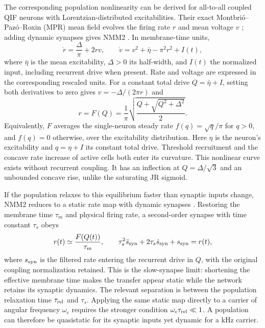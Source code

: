 \documentclass[11pt,a4paper]{article}
\providecommand{\DIFaddtex}[1]{{\protect\color{blue} \sf #1}} %
\providecommand{\DIFaddbegin}{} %
\providecommand{\DIFaddend}{} %
\providecommand{\DIFadd}[1]{\texorpdfstring{\DIFaddtex{#1}}{#1}} %
\begin{document}
The corresponding population nonlinearity can be derived for all-to-all coupled
QIF neurons with Lorentzian-distributed excitabilities. Their exact
Montbri\'o--Paz\'o--Roxin (MPR) mean field evolves the firing rate $r$ and mean voltage
$v$ \cite{montbrio2015}; adding dynamic synapses gives NMM2
\cite{ruffini2021nmm2,clusella2023}. In membrane-time units,
\begin{equation}
\dot r=\frac{\Delta}{\pi}+2rv,\qquad
\dot v=v^2+\bar\eta-\pi^2r^2+I(t),
\label{eq:mpr}
\end{equation}
where $\bar\eta$ is the mean excitability, $\Delta>0$ its half-width, and $I(t)$ the
normalized input, including recurrent drive when present. Rate and voltage are
expressed in the corresponding rescaled units. For a constant total drive
$Q=\bar\eta+I$, setting both derivatives to zero gives $v=-\Delta/(2\pi r)$ and
\begin{equation}
r=F(Q)=\frac{1}{\pi}\sqrt{\frac{Q+\sqrt{Q^2+\Delta^2}}{2}} .
\label{eq:Fmpr}
\end{equation}
\DIFaddbegin \DIFadd{Equivalently, $F$ averages the single-neuron steady rate $f(q)=\sqrt q/\pi$ for
$q>0$, and $f(q)=0$ otherwise, over the excitability distribution. Here $\eta$ is
the neuron's excitability and $q=\eta+I$ its constant total drive. Threshold
recruitment and the concave rate increase of active cells both enter its curvature. }\DIFaddend This nonlinear curve exists
without recurrent coupling. It has an inflection at
$Q=\Delta/\sqrt3$ and an unbounded concave rise, unlike the saturating JR sigmoid.

If the population relaxes to this equilibrium faster than synaptic inputs change,
NMM2 reduces to a static rate map with dynamic synapses
\cite{ruffini2021nmm2,clusella2023}. Restoring the membrane time $\tau_m$ and physical
firing rate, a second-order synapse with time constant $\tau_s$ obeys
\begin{equation}
r(t)\simeq \frac{F(Q(t))}{\tau_m},\qquad
\tau_s^2\ddot s_{\rm syn}+2\tau_s\dot s_{\rm syn}+s_{\rm syn}=r(t),
\label{eq:slow_synapse}
\end{equation}
where $s_{\rm syn}$ is the filtered rate entering the recurrent drive in $Q$, with the original
coupling normalization retained. This is the slow-synapse limit: shortening the
effective membrane time makes the transfer appear static while the network retains
its synaptic dynamics. The relevant separation is between the population relaxation
time $\tau_{\rm rel}$ and $\tau_s$. Applying the same static map directly to a
carrier of angular frequency $\omega_c$ requires the stronger condition
$\omega_c\tau_{\rm rel}\ll1$. A population can therefore be quasistatic for its
synaptic inputs yet dynamic for a kHz carrier.
\end{document}
